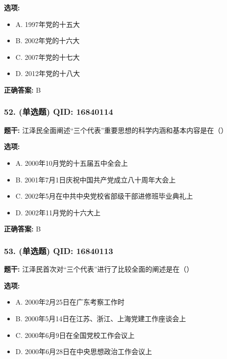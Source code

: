 \documentclass[12pt,UTF8]{ctexart}
\begin{document}
\textbf{选项:}
\begin{itemize}[leftmargin=*]

  \item A. 1997年党的十五大

  \item B. 2002年党的十六大

  \item C. 2007年党的十七大

  \item D. 2012年党的十八大

\end{itemize}

\textbf{正确答案:}
B

\vspace{0.3em}\hrulefill\vspace{0.7em}

\subsubsection*{52. (单选题) \small QID: 16840114}

\textbf{题干:}
江泽民全面阐述“三个代表”重要思想的科学内涵和基本内容是在（）

\textbf{选项:}
\begin{itemize}[leftmargin=*]

  \item A. 2000年10月党的十五届五中全会上

  \item B. 2001年7月1日庆祝中国共产党成立八十周年大会上

  \item C. 2002年5月在中共中央党校省部级干部进修班毕业典礼上

  \item D. 2002年11月党的十六大上

\end{itemize}

\textbf{正确答案:}
B

\vspace{0.3em}\hrulefill\vspace{0.7em}

\subsubsection*{53. (单选题) \small QID: 16840113}

\textbf{题干:}
江泽民首次对“三个代表”进行了比较全面的阐述是在（）

\textbf{选项:}
\begin{itemize}[leftmargin=*]

  \item A. 2000年2月25日在广东考察工作时

  \item B. 2000年5月14日在江苏、浙江、上海党建工作座谈会上

  \item C. 2000年6月9日在全国党校工作会议上

  \item D. 2000年6月28日在中央思想政治工作会议上

\end{itemize}
\end{document}
